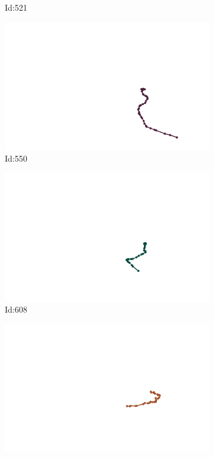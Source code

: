\documentclass[12pt,twoside]{report}
\begin{document}
\begin{figure}
\begin{subfigure}[b]{0.20\textwidth}
\caption{Id:521}
\end{subfigure}
\begin{subfigure}[b]{0.20\textwidth}
\centering
\includegraphics[width=\textwidth]{../../trajectories/550.png}
\caption{Id:550}
\end{subfigure}
\begin{subfigure}[b]{0.20\textwidth}
\centering
\includegraphics[width=\textwidth]{../../trajectories/608.png}
\caption{Id:608}
\end{subfigure}
\begin{subfigure}[b]{0.20\textwidth}
\centering
\includegraphics[width=\textwidth]{../../trajectories/649.png}

\end{subfigure}
\end{figure}
\end{document}
